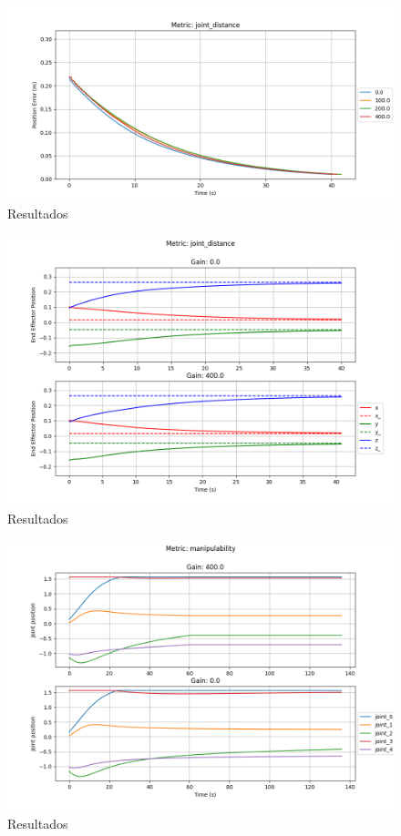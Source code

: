 \begin{figure}
    \centering
    \includegraphics[width=1.0\textwidth]{Images/joint_distance/position_error_joint_distance.png}
    \caption{Resultados}\label{fig:jd-e}
\end{figure}

\begin{figure}
    \centering
    \includegraphics[width=1.0\textwidth]{Images/joint_distance/position_joint_distance.png}
    \caption{Resultados}\label{fig:jd-p}
\end{figure}

\begin{figure}
    \centering
    \includegraphics[width=1.0\textwidth]{Images/manipulability/joint_states_manipulability.png}
    \caption{Resultados}\label{fig:m-js}
\end{figure}

